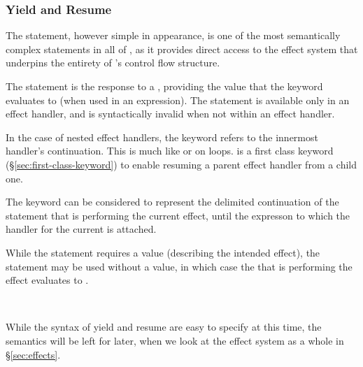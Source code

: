 \subsubsection{Yield and Resume}
\label{sec:prose-resume}

The  statement, however simple in appearance, is one of the most
semantically complex statements in all of \Trilogy{}, as it provides direct
access to the effect system that underpins the entirety of \Trilogy{}'s control
flow structure.

The  statement is the response to a , providing the value
that the  keyword evaluates to (when used in an expression). The
 statement is available only in an effect handler, and is syntactically
invalid when not within an effect handler.

In the case of nested effect handlers, the  keyword refers to the
innermost handler's continuation. This is much like  or 
on loops.  is a first class keyword (\S\ref{sec:first-class-keyword})
to enable resuming a parent effect handler from a child one.

The  keyword can be considered to represent the delimited continuation of
the  statement that is performing the current effect, until the
expresson to which the handler for the current  is attached.

While the  statement requires a value (describing the intended effect), the
 statement may be used without a value, in which case the  that
is performing the effect evaluates to .

\begin{bnf*}
     \\
\end{bnf*}

While the syntax of yield and resume are easy to specify at this time, the semantics
will be left for later, when we look at the effect system as a whole in \S\ref{sec:effects}.
